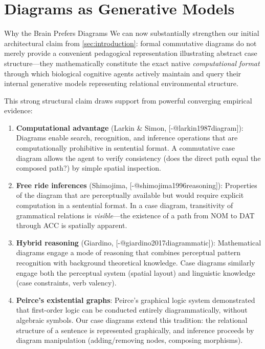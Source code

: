 \documentclass[
  ignorenonframetext,
]{beamer}
\author{\texorpdfstring{}{}}
\date{}
\begin{document}
\section{Diagrams as Generative
Models}\label{sec:diagrammatic-cognition}

\begin{frame}{Why the Brain Prefers Diagrams}
\protect{}\label{why-the-brain-prefers-diagrams}
We can now substantially strengthen our initial architectural claim from
\autoref{sec:introduction}: formal commutative diagrams do not merely
provide a convenient pedagogical representation illustrating abstract
case structure---they mathematically constitute the exact native
\emph{computational format} through which biological cognitive agents
actively maintain and query their internal generative models
representing relational environmental structure.

This strong structural claim draws support from powerful converging
empirical evidence:

\begin{enumerate}
\item
  \textbf{Computational advantage} (Larkin \& Simon,
  {[}-@larkin1987diagram{]}): Diagrams enable search, recognition, and
  inference operations that are computationally prohibitive in
  sentential format. A commutative case diagram allows the agent to
  verify consistency (does the direct path equal the composed path?) by
  simple spatial inspection.
\item
  \textbf{Free ride inferences} (Shimojima,
  {[}-@shimojima1996reasoning{]}): Properties of the diagram that are
  perceptually available but would require explicit computation in a
  sentential format. In a case diagram, transitivity of grammatical
  relations is \emph{visible}---the existence of a path from NOM to DAT
  through ACC is spatially apparent.
\item
  \textbf{Hybrid reasoning} (Giardino,
  {[}-@giardino2017diagrammatic{]}): Mathematical diagrams engage a mode
  of reasoning that combines perceptual pattern recognition with
  background theoretical knowledge. Case diagrams similarly engage both
  the perceptual system (spatial layout) and linguistic knowledge (case
  constraints, verb valency).
\item
  \textbf{Peirce's existential graphs}: Peirce's graphical logic system
  demonstrated that first-order logic can be conducted entirely
  diagrammatically, without algebraic symbols. Our case diagrams extend
  this tradition: the relational structure of a sentence is represented
  graphically, and inference proceeds by diagram manipulation
  (adding/removing nodes, composing morphisms).
\end{enumerate}
\end{frame}
\end{document}
